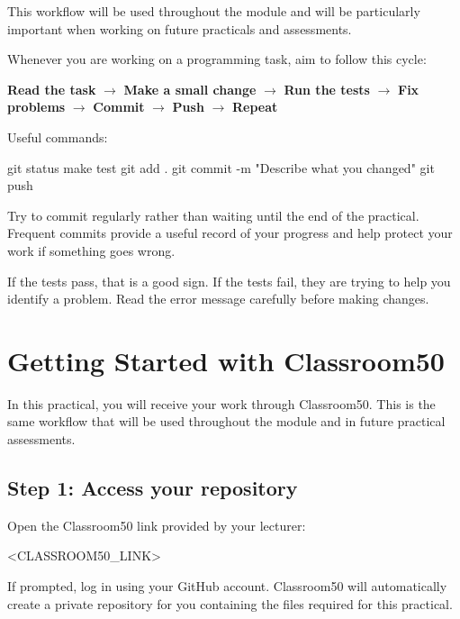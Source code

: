 \documentclass{csc2059practical}
\begin{document}
\begin{workflowreminder}
This workflow will be used throughout the module and will be particularly important when working on future practicals and assessments.

Whenever you are working on a programming task, aim to follow this cycle:

\begin{center}
\textbf{Read the task} $\rightarrow$ \textbf{Make a small change} $\rightarrow$ \textbf{Run the tests} $\rightarrow$ \textbf{Fix problems} $\rightarrow$ \textbf{Commit} $\rightarrow$ \textbf{Push} $\rightarrow$ \textbf{Repeat}
\end{center}

Useful commands:

\begin{bashcode}
git status
make test
git add .
git commit -m "Describe what you changed"
git push
\end{bashcode}

Try to commit regularly rather than waiting until the end of the practical. Frequent commits provide a useful record of your progress and help protect your work if something goes wrong.
\end{workflowreminder}

\begin{tipbox}
If the tests pass, that is a good sign. If the tests fail, they are trying to help you identify a problem. Read the error message carefully before making changes.
\end{tipbox}

\section{Getting Started with Classroom50}

In this practical, you will receive your work through Classroom50. This is the same workflow that will be used throughout the module and in future practical assessments.

\subsection{Step 1: Access your repository}

Open the Classroom50 link provided by your lecturer:

\begin{terminal}
<CLASSROOM50_LINK>
\end{terminal}

If prompted, log in using your GitHub account. Classroom50 will automatically create a private repository for you containing the files required for this practical.
\end{document}
